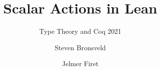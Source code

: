 \documentclass{beamer}
\author{Steven Bronsveld \and Jelmer Firet}
\title{Scalar Actions in Lean}
\subtitle{Type Theory and Coq 2021}
\date{}
\institute[Radboud University Nijmegen]{Radboud University Nijmegen}
\begin{document}
	\begin{frame}[t]
	\titlepage
	\end{frame}

	
\end{document}
